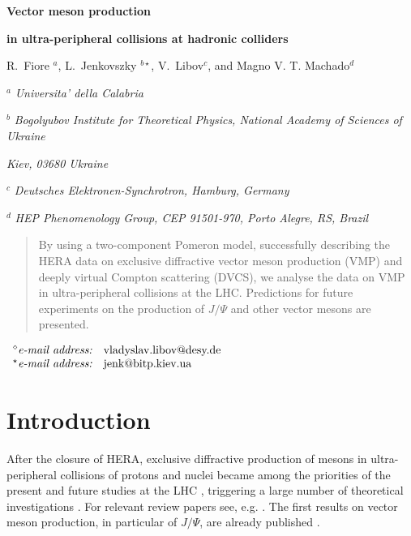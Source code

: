 \documentclass[12pt]{article}
\begin{document}
\vskip 0.5cm \centerline{\bf\Large Vector meson production}
\centerline{\bf\Large in ultra-peripheral collisions at hadronic colliders}  \vskip 0.3cm
\centerline{R.~Fiore $^a$, L.~Jenkovszky $^{b\star}$, V.~Libov$^c$, and Magno V. T. Machado$^d$}

\vskip 1cm

\centerline{$^a$ \sl Universita' della Calabria}
\centerline{$^b$ \sl Bogolyubov Institute for Theoretical Physics,
National Academy of Sciences of Ukraine} \centerline{\sl Kiev,
03680 Ukraine} 
\centerline{$^c$ \sl Deutsches Elektronen-Synchrotron, Hamburg, Germany}
\centerline{$^d$ \sl HEP Phenomenology Group, CEP 91501-970, Porto Alegre, RS, Brazil
}
\vskip
0.1cm

\begin{abstract}\noindent
By using a two-component Pomeron model, successfully describing the HERA data on exclusive diffractive vector meson production (VMP) and deeply virtual Compton scattering (DVCS), we analyse the data on VMP in ultra-peripheral collisions at the LHC. Predictions for future experiments on the production of $J/\Psi$ and other vector mesons are presented.
\end{abstract}

\vskip 0.1cm

$
\begin{array}{ll}

^{\diamond}\mbox{{\it e-mail address:}} &
   \mbox{vladyslav.libov@desy.de} \\
^{\star}\mbox{{\it e-mail address:}} &
   \mbox{jenk@bitp.kiev.ua} \\


\end{array}
$


\section{Introduction}\label{Int}

After the closure of HERA, exclusive diffractive production of mesons in ultra-peripheral collisions of protons and nuclei became among the priorities of the present and future studies at the LHC \cite{LHCb1, LHCb2}, triggering a large number of theoretical investigations \cite{Schafer, Brazil, Ryskin, Motyka, Szczurek}. For relevant review papers see, e.g. \cite{Review}.
The first results on vector meson production, in particular of $J/\Psi$, are already published \cite{LHCb1, LHCb2}.
\end{document}
